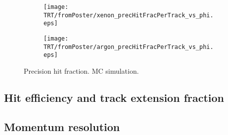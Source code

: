 \begin{figure}

\begin{subfigure}{.5\textwidth}
  \centering
  \texttt{[image: TRT/fromPoster/xenon\_precHitFracPerTrack\_vs\_phi.eps]}
\end{subfigure}%
\begin{subfigure}{.5\textwidth}
  \centering
  \texttt{[image: TRT/fromPoster/argon\_precHitFracPerTrack\_vs\_phi.eps]}
\end{subfigure}

\caption{Precision hit fraction. MC simulation.}
  \label{fig:precHitFracPerTrack}
\end{figure}

\subsection{Hit efficiency and track extension fraction}

\subsection{Momentum resolution}



